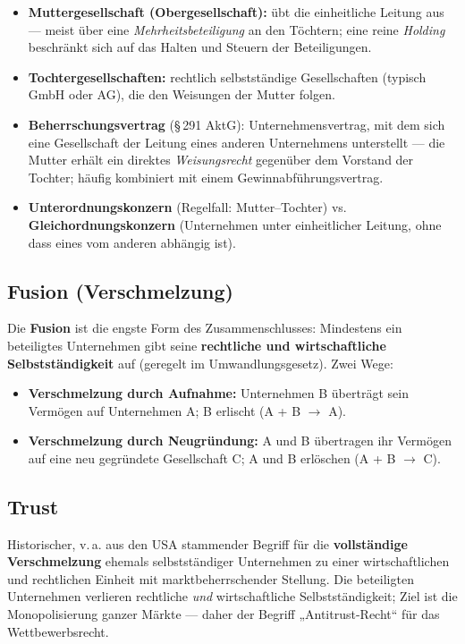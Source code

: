 \documentclass[11pt, a4paper]{article}
\begin{document}
\begin{itemize}
  \item \textbf{Muttergesellschaft (Obergesellschaft):} übt die einheitliche Leitung aus
    --- meist über eine \emph{Mehrheitsbeteiligung} an den Töchtern; eine reine
    \emph{Holding} beschränkt sich auf das Halten und Steuern der Beteiligungen.
  \item \textbf{Tochtergesellschaften:} rechtlich selbstständige Gesellschaften
    (typisch GmbH oder AG), die den Weisungen der Mutter folgen.
  \item \textbf{Beherrschungsvertrag} (\S\,291 AktG): Unternehmensvertrag, mit dem sich
    eine Gesellschaft der Leitung eines anderen Unternehmens unterstellt --- die Mutter
    erhält ein direktes \emph{Weisungsrecht} gegenüber dem Vorstand der Tochter; häufig
    kombiniert mit einem Gewinnabführungsvertrag.
  \item \textbf{Unterordnungskonzern} (Regelfall: Mutter--Tochter) vs.
    \textbf{Gleichordnungskonzern} (Unternehmen unter einheitlicher Leitung, ohne dass
    eines vom anderen abhängig ist).
\end{itemize}

\subsection{Fusion (Verschmelzung)}

Die \textbf{Fusion} ist die engste Form des Zusammenschlusses: Mindestens ein beteiligtes
Unternehmen gibt seine \textbf{rechtliche und wirtschaftliche Selbstständigkeit} auf
(geregelt im Umwandlungsgesetz). Zwei Wege:

\begin{itemize}
  \item \textbf{Verschmelzung durch Aufnahme:} Unternehmen B überträgt sein Vermögen auf
    Unternehmen A; B erlischt (A + B $\rightarrow$ A).
  \item \textbf{Verschmelzung durch Neugründung:} A und B übertragen ihr Vermögen auf
    eine neu gegründete Gesellschaft C; A und B erlöschen (A + B $\rightarrow$ C).
\end{itemize}

\subsection{Trust}

Historischer, v.\,a. aus den USA stammender Begriff für die \textbf{vollständige
Verschmelzung} ehemals selbstständiger Unternehmen zu einer wirtschaftlichen und
rechtlichen Einheit mit marktbeherrschender Stellung. Die beteiligten Unternehmen
verlieren rechtliche \emph{und} wirtschaftliche Selbstständigkeit; Ziel ist die
Monopolisierung ganzer Märkte --- daher der Begriff „Antitrust-Recht`` für das
Wettbewerbsrecht.
\end{document}
